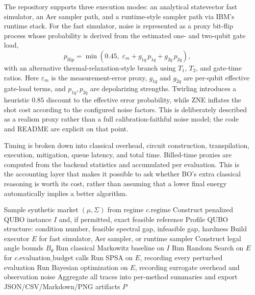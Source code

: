 \documentclass[11pt]{article}
\begin{document}
The repository supports three execution modes: an analytical statevector fast simulator, an Aer sampler path, and a runtime-style sampler path via IBM's runtime stack. For the fast simulator, noise is represented as a proxy bit-flip process whose probability is derived from the estimated one- and two-qubit gate load,
\begin{equation}
p_{\mathrm{flip}}
 = \min\!\left(
0.45,\;
\varepsilon_m + g_{1q}\,p_{1q} + g_{2q}\,p_{2q}
\right),
\label{eq:noiseproxy}
\end{equation}
with an alternative thermal-relaxation-style branch using \(T_1\), \(T_2\), and gate-time ratios. Here \(\varepsilon_m\) is the measurement-error proxy, \(g_{1q}\) and \(g_{2q}\) are per-qubit effective gate-load terms, and \(p_{1q},p_{2q}\) are depolarizing strengths. Twirling introduces a heuristic \(0.85\) discount to the effective error probability, while ZNE inflates the shot cost according to the configured noise factors. This is deliberately described as a realism proxy rather than a full calibration-faithful noise model; the code and README are explicit on that point.

Timing is broken down into classical overhead, circuit construction, transpilation, execution, mitigation, queue latency, and total time. Billed-time proxies are computed from the backend statistics and accumulated per evaluation. This is the accounting layer that makes it possible to ask whether BO's extra classical reasoning is worth its cost, rather than assuming that a lower final energy automatically implies a better algorithm.

\begin{algorithm}[t]
\caption{Runtime-aware benchmark pipeline}
\label{alg:benchmark}
Sample synthetic market \((\mu,\Sigma)\) from regime \(c.\mathrm{regime}\)\;
Construct penalized QUBO instance \(I\) and, if permitted, exact feasible reference\;
Profile QUBO structure: condition number, feasible spectral gap, infeasible gap, hardness\;
Build executor \(E\) for fast simulator, Aer sampler, or runtime sampler\;
Construct legal angle bounds \(B_\theta\)\;
Run classical Markowitz baseline on \(I\)\;
Run Random Search on \(E\) for \(c.\mathrm{evaluation\_budget}\) calls\;
Run SPSA on \(E\), recording every perturbed evaluation\;
Run Bayesian optimization on \(E\), recording surrogate overhead and observation noise\;
Aggregate all traces into per-method summaries and export JSON/CSV/Markdown/PNG artifacts\;
\Return \(P\)\;
\end{algorithm}
\end{document}
